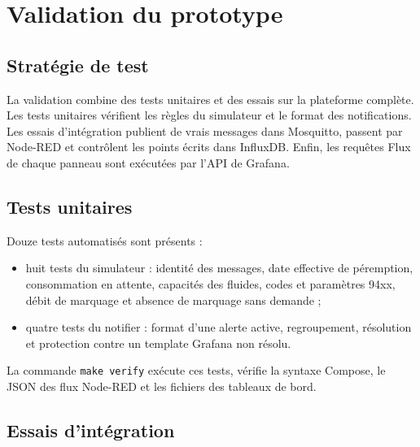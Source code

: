 \chapter{Validation du prototype}

\section{Stratégie de test}

La validation combine des tests unitaires et des essais sur la plateforme
complète. Les tests unitaires vérifient les règles du simulateur et le format
des notifications. Les essais d'intégration publient de vrais messages dans
Mosquitto, passent par Node-RED et contrôlent les points écrits dans InfluxDB.
Enfin, les requêtes Flux de chaque panneau sont exécutées par l'API de Grafana.

\section{Tests unitaires}

Douze tests automatisés sont présents :

\begin{itemize}
  \item huit tests du simulateur : identité des messages, date effective de
        péremption, consommation en attente, capacités des fluides, codes et
        paramètres 94xx, débit de marquage et absence de marquage sans demande ;
  \item quatre tests du notifier : format d'une alerte active, regroupement,
        résolution et protection contre un template Grafana non résolu.
\end{itemize}

La commande \texttt{make verify} exécute ces tests, vérifie la syntaxe Compose,
le JSON des flux Node-RED et les fichiers des tableaux de bord.

\section{Essais d'intégration}


